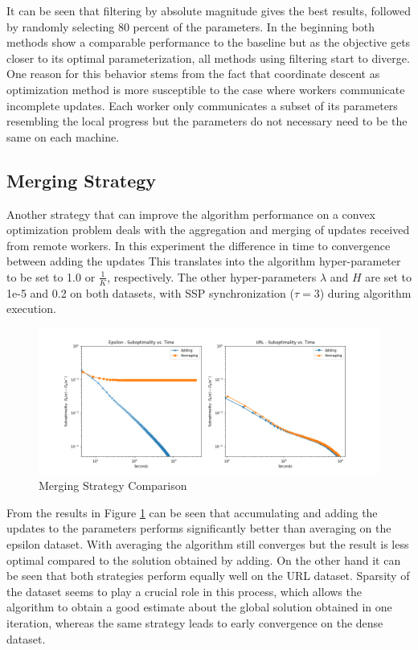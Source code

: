 It can be seen that filtering by absolute magnitude gives the best results, followed by randomly selecting 80 percent of the parameters.
In the beginning both methods show a comparable performance to the baseline but as the objective gets closer to its optimal parameterization, all methods using filtering start to diverge.
One reason for this behavior stems from the fact that coordinate descent as optimization method is more susceptible to the case where workers communicate incomplete updates.
Each worker only communicates a subset of its parameters resembling the local progress but the parameters do not necessary need to be the same on each machine.

\subsection{Merging Strategy}
\label{ss:merging_strategy}
Another strategy that can improve the algorithm performance on a convex optimization problem deals with the aggregation and merging of updates received from remote workers.
In this experiment the difference in time to convergence between adding the updates
This translates into the algorithm hyper-parameter to be set to 1.0 or $\frac{1}{K}$, respectively.
The other hyper-parameters $\lambda$ and $H$ are set to 1e-5 and 0.2 on both datasets, with SSP synchronization ($\tau=3$) during algorithm execution.
\begin{figure}[ht]
\centering
\includegraphics[width=1.0\textwidth]{img/merg_strat_cmp.png}
\caption{Merging Strategy Comparison}
\label{fig:merg_strat_cmp}
\end{figure}
From the results in Figure \ref{fig:merg_strat_cmp} can be seen that accumulating and adding the updates to the parameters performs significantly better than averaging on the epsilon dataset.
With averaging the algorithm still converges but the result is less optimal compared to the solution obtained by adding.
On the other hand it can be seen that both strategies perform equally well on the URL dataset.
Sparsity of the dataset seems to play a crucial role in this process, which allows the algorithm to obtain a good estimate about the global solution obtained in one iteration, whereas the same strategy leads to early convergence on the dense dataset.
